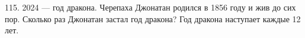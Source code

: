 115. 2024 --- год дракона. Черепаха Джонатан родился в 1856 году и жив до сих пор. Сколько раз Джонатан застал год дракона? Год дракона наступает каждые 12 лет.\\
